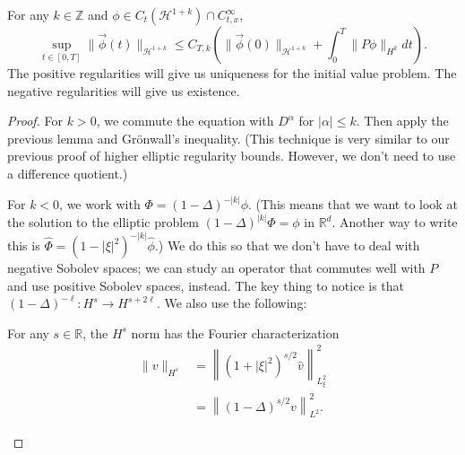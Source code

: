 \begin{lemma}
    For any $k \in \mathbb{Z}$ and $\phi \in C_{t}\left(\mathcal{H}^{1+k}\right) \cap C_{t, x}^{\infty}$,
    $$
    \sup _{t \in[0, T]}\|\vec{\phi}(t)\|_{\mathcal{H}^{1+k}} \leq C_{T, k}\left(\|\vec{\phi}(0)\|_{\mathcal{H}^{1+k}}+\int_{0}^{T}\|P \phi\|_{H^{k}} d t\right) .
    $$
    The positive regularities will give us uniqueness for the initial value problem. The negative regularities will give us existence.
\end{lemma}
\begin{proof}
    For $k>0$, we commute the equation with $D^{\alpha}$ for $|\alpha| \leq k$. Then apply the previous lemma and Grönwall's inequality. (This technique is very similar to our previous proof of higher elliptic regularity bounds. However, we don't need to use a difference quotient.)
    
    For $k<0$, we work with $\Phi=(1-\Delta)^{-|k|} \phi$. (This means that we want to look at the solution to the elliptic problem $(1-\Delta)^{|k|} \Phi=\phi$ in $\mathbb{R}^{d}$. Another way to write this is $\widehat{\Phi}=\left(1-|\xi|^{2}\right)^{-|k|} \widehat{\phi}$.) We do this so that we don't have to deal with negative Sobolev spaces; we can study an operator that commutes well with $P$ and use positive Sobolev spaces, instead. The key thing to notice is that $(1-\Delta)^{-\ell}: H^{s} \rightarrow H^{s+2 \ell}$. We also use the following:
    \begin{lemma}
        For any $s \in \mathbb{R}$, the $H^{s}$ norm has the Fourier characterization
        $$
        \begin{aligned}
        \|v\|_{H^{s}} &=\left\|\left(1+|\xi|^{2}\right)^{s / 2} \widehat{v}\right\|_{L_{\xi}^{2}}^{2} \\
        &=\left\|(1-\Delta)^{s / 2} v\right\|_{L^{2}}^{2} .
        \end{aligned}
        $$
    \end{lemma}


\end{proof}
